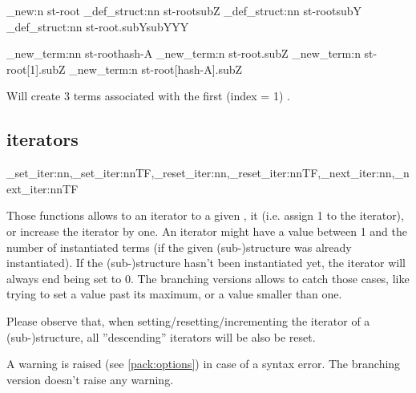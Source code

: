 \documentclass[10pt]{article}
\begin{document}
\begin{codestore}[store-env=demo6]
\starray_new:n {st-root}
\starray_def_struct:nn {st-root}{subZ}
\starray_def_struct:nn {st-root}{subY}
\starray_def_struct:nn {st-root.subY}{subYYY}

\starray_new_term:nn {st-root}{hash-A}
\starray_new_term:n {st-root.subZ}
\starray_new_term:n {st-root[1].subZ}
\starray_new_term:n {st-root[hash-A].subZ}
\end{codestore}
 
Will create 3  terms associated with the first (index = 1) .


\subsection{iterators}\label{pack:iter}

\begin{codedescribe}{\starray_set_iter:nn,\starray_set_iter:nnTF,\starray_reset_iter:nn,\starray_reset_iter:nnTF,\starray_next_iter:nn,\starray_next_iter:nnTF}
\begin{codesyntax}%
\end{codesyntax}
Those functions allows to  an iterator to a given ,  it (i.e. assign 1 to the iterator), or increase the iterator by one. An iterator might have a value between 1 and the number of instantiated terms (if the given (sub-)structure was already instantiated). If the (sub-)structure hasn't been instantiated yet, the iterator will always end being set to 0. The branching versions allows to catch those cases, like trying to set a value past its maximum, or a value smaller than one.
\end{codedescribe}

\begin{tsremark}[Important:]
Please observe that, when setting/resetting/incrementing the  iterator of a (sub-)structure, all ''descending'' iterators will be also be reset.
\end{tsremark}
\begin{tsremark}
A warning is raised (see \ref{pack:options}) in case of a  syntax error. The branching version doesn't raise any warning.
\end{tsremark}
\end{document}
